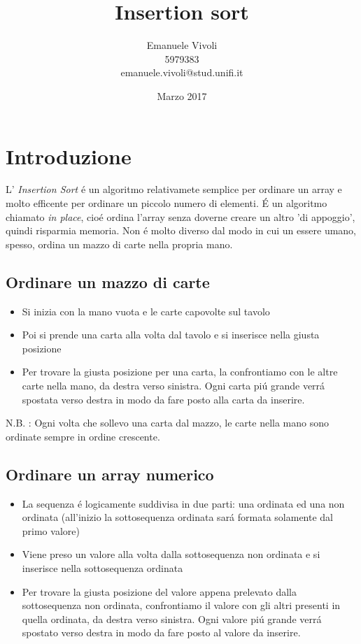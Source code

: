 \documentclass[a4paper, 9pt]{article}
\title{\huge{Insertion sort}}
\author{Emanuele Vivoli \\ {5979383} \\ {emanuele.vivoli@stud.unifi.it} }
\date{Marzo 2017}
\begin{document}
    \maketitle
    \vspace{4cm}
    \tableofcontents
    
    
    
    
    \newpage
    
    \section{Introduzione}
    L' \textit{Insertion Sort} \'e un algoritmo relativamete semplice per ordinare un array e molto efficente per ordinare un piccolo numero di elementi. \'E un algoritmo chiamato \textit{in place}, cio\'e ordina l'array senza doverne creare un altro 'di appoggio', quindi risparmia memoria.
    Non \'e molto diverso dal modo in cui un essere umano, spesso, ordina un mazzo di carte nella propria mano.
    
    \subsection{Ordinare un mazzo di carte}
    \begin{itemize}
        \item Si inizia con la mano vuota e le carte capovolte sul tavolo
        \item Poi si prende una carta alla volta dal tavolo e si inserisce nella
    giusta posizione
        \item Per trovare la giusta posizione per una carta, la confrontiamo
    con le altre carte nella mano, da destra verso sinistra. Ogni
    carta pi\'u grande verr\'a spostata verso destra in modo da fare
    posto alla carta da inserire.
    \end{itemize}
    
    N.B. : Ogni volta che sollevo una carta dal mazzo, le carte nella mano sono ordinate sempre in ordine crescente.
    
    \subsection{Ordinare un array numerico}
    \begin{itemize}
        \item La sequenza \'e logicamente suddivisa in due parti: una ordinata ed una non ordinata (all'inizio la sottosequenza ordinata sar\'a formata solamente dal primo valore)
        \item Viene preso un valore alla volta dalla sottosequenza non ordinata e si inserisce nella sottosequenza ordinata
        \item Per trovare la giusta posizione del valore appena prelevato dalla sottosequenza non ordinata, confrontiamo il valore con gli altri presenti in quella ordinata, da destra verso sinistra. Ogni valore pi\'u grande verr\'a spostato verso destra in modo da fare posto al valore da inserire.
    \end{itemize}
    
\end{document}
